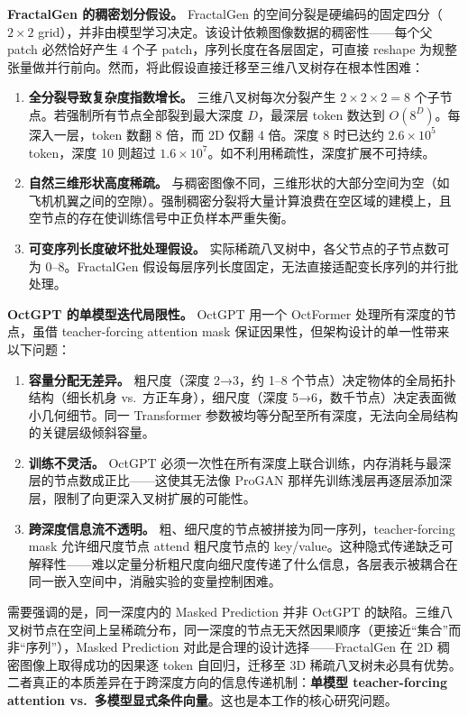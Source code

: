 \documentclass[12pt,a4paper]{article}
\begin{document}
\textbf{FractalGen 的稠密划分假设。}
FractalGen 的空间分裂是硬编码的固定四分（$2\times2$ grid），并非由模型学习决定。该设计依赖图像数据的稠密性——每个父 patch 必然恰好产生 4 个子 patch，序列长度在各层固定，可直接 reshape 为规整张量做并行前向。然而，将此假设直接迁移至三维八叉树存在根本性困难：
\begin{enumerate}
    \item \textbf{全分裂导致复杂度指数增长。} 三维八叉树每次分裂产生 $2\times2\times2=8$ 个子节点。若强制所有节点全部裂到最大深度 $D$，最深层 token 数达到 $O(8^D)$。每深入一层，token 数翻 8 倍，而 2D 仅翻 4 倍。深度 8 时已达约 $2.6\times10^5$ token，深度 10 则超过 $1.6\times10^7$。如不利用稀疏性，深度扩展不可持续。
    \item \textbf{自然三维形状高度稀疏。} 与稠密图像不同，三维形状的大部分空间为空（如飞机机翼之间的空隙）。强制稠密分裂将大量计算浪费在空区域的建模上，且空节点的存在使训练信号中正负样本严重失衡。
    \item \textbf{可变序列长度破坏批处理假设。} 实际稀疏八叉树中，各父节点的子节点数可为 0--8。FractalGen 假设每层序列长度固定，无法直接适配变长序列的并行批处理。
\end{enumerate}

\textbf{OctGPT 的单模型迭代局限性。}
OctGPT 用一个 OctFormer 处理所有深度的节点，虽借 teacher-forcing attention mask 保证因果性，但架构设计的单一性带来以下问题：
\begin{enumerate}
    \item \textbf{容量分配无差异。} 粗尺度（深度 2→3，约 1--8 个节点）决定物体的全局拓扑结构（细长机身 vs.\ 方正车身），细尺度（深度 5→6，数千节点）决定表面微小几何细节。同一 Transformer 参数被均等分配至所有深度，无法向全局结构的关键层级倾斜容量。
    \item \textbf{训练不灵活。} OctGPT 必须一次性在所有深度上联合训练，内存消耗与最深层的节点数成正比——这使其无法像 ProGAN 那样先训练浅层再逐层添加深层，限制了向更深入叉树扩展的可能性。
    \item \textbf{跨深度信息流不透明。} 粗、细尺度的节点被拼接为同一序列，teacher-forcing mask 允许细尺度节点 attend 粗尺度节点的 key/value。这种隐式传递缺乏可解释性——难以定量分析粗尺度向细尺度传递了什么信息，各层表示被耦合在同一嵌入空间中，消融实验的变量控制困难。
\end{enumerate}

需要强调的是，同一深度内的 Masked Prediction 并非 OctGPT 的缺陷。三维八叉树节点在空间上呈稀疏分布，同一深度的节点无天然因果顺序（更接近“集合”而非“序列”），Masked Prediction 对此是合理的设计选择——FractalGen 在 2D 稠密图像上取得成功的因果逐 token 自回归，迁移至 3D 稀疏八叉树未必具有优势。二者真正的本质差异在于跨深度方向的信息传递机制：\textbf{单模型 teacher-forcing attention vs.\ 多模型显式条件向量}。这也是本工作的核心研究问题。
\end{document}
